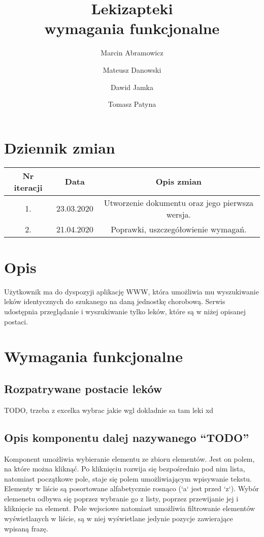 \documentclass{article}
\title{
Lekizapteki\\
\large wymagania funkcjonalne}
\author{Marcin Abramowicz \and Mateusz Danowski \and Dawid Jamka \and Tomasz Patyna}
\begin{document}
  \maketitle

  \section{Dziennik zmian}
  \begin{tabular}{|c|c|c|}
    Nr iteracji & Data & Opis zmian \\
    \hline
    1. & 23.03.2020 & Utworzenie dokumentu oraz jego pierwsza wersja. \\
    \hline
    2. & 21.04.2020 & Poprawki, uszczegółowienie wymagań.
  \end{tabular}

  \section{Opis}
  Użytkownik ma do dyspozyji aplikację WWW, która umożliwia mu wyszukiwanie leków identycznych do szukanego na daną jednostkę chorobową.
  Serwis udostępnia przeglądanie i wyszukiwanie tylko leków, które są w niżej opisanej postaci.

  \section{Wymagania funkcjonalne}
    \subsection{Rozpatrywane postacie leków}
    TODO, trzeba z excelka wybrac jakie wgl dokladnie sa tam leki xd

    \subsection{Opis komponentu dalej nazywanego ``TODO''}
    Komponent umożliwia wybieranie elementu ze zbioru elementów.
    Jest on polem, na które można kliknąć.
    Po kliknięciu rozwija się bezpośrednio pod nim lista, natomiast początkowe pole, staje się polem umożliwiającym wpisywanie tekstu.
    Elementy w liście są posortowane alfabetycznie rosnąco (`a` jest przed `z`).
    Wybór elemenetu odbywa się poprzez wybranie go z listy, poprzez przewijanie jej i kliknięcie na element.
    Pole wejsciowe natomiast umożliwia filtrowanie elementów wyświetlanych w liście, są w niej wyświetlane jedynie pozycje zawierające wpisaną frazę.
\end{document}
